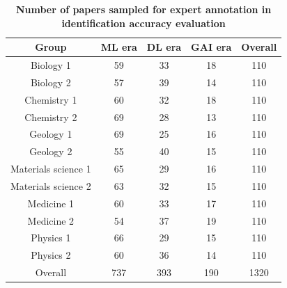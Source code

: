 \clearpage
\newpage
\begin{table}[ht]
\caption{\textbf{Number of papers sampled for expert annotation in identification accuracy evaluation}}
\centering
\begin{tabular}{@{}c|ccc|c@{}}
\toprule
Group               & ML era & DL era & GAI era & Overall \\ \midrule
Biology 1           & 59     & 33     & 18      & 110     \\
Biology 2           & 57     & 39     & 14      & 110     \\
Chemistry 1         & 60     & 32     & 18      & 110     \\
Chemistry 2         & 69     & 28     & 13      & 110     \\
Geology 1           & 69     & 25     & 16      & 110     \\
Geology 2           & 55     & 40     & 15      & 110     \\
Materials science 1 & 65     & 29     & 16      & 110     \\
Materials science 2 & 63     & 32     & 15      & 110     \\
Medicine 1          & 60     & 33     & 17      & 110     \\
Medicine 2          & 54     & 37     & 19      & 110     \\
Physics 1           & 66     & 29     & 15      & 110     \\
Physics 2           & 60     & 36     & 14      & 110     \\ \midrule
Overall             & 737    & 393    & 190     & 1320    \\ \bottomrule
\end{tabular}
\label{tab2}
\end{table}


